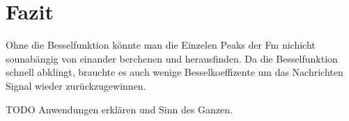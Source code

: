 %
%
%
\section{Fazit
\label{fm:section:fazit}}
Ohne die Besselfunktion könnte man die Einzelen Peaks der Fm nichicht sounabängig von einander berchenen und herausfinden.
Da die Besselfunktion schnell abklingt, brauchte es auch wenige Besselkoeffizente um das Nachrichten Signal wieder zurückzugewinnen.

TODO  Anwendungen erklären und Sinn des Ganzen.